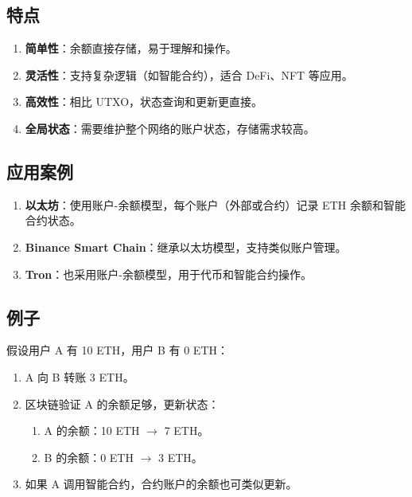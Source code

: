\documentclass[12pt]{ctexart}
\begin{document}
\subsection{特点}
\begin{enumerate}
    \item \textbf{简单性}：余额直接存储，易于理解和操作。
    \item \textbf{灵活性}：支持复杂逻辑（如智能合约），适合 DeFi、NFT 等应用。
    \item \textbf{高效性}：相比 UTXO，状态查询和更新更直接。
    \item \textbf{全局状态}：需要维护整个网络的账户状态，存储需求较高。
\end{enumerate}

\subsection{应用案例}
\begin{enumerate}
    \item \textbf{以太坊}：使用账户-余额模型，每个账户（外部或合约）记录 ETH 余额和智能合约状态。
    \item \textbf{Binance Smart Chain}：继承以太坊模型，支持类似账户管理。
    \item \textbf{Tron}：也采用账户-余额模型，用于代币和智能合约操作。
\end{enumerate}

\subsection{例子}
假设用户 A 有 10 ETH，用户 B 有 0 ETH：
\begin{enumerate}
    \item A 向 B 转账 3 ETH。
    \item 区块链验证 A 的余额足够，更新状态：
        \begin{enumerate}
            \item A 的余额：10 ETH $\rightarrow$ 7 ETH。
            \item B 的余额：0 ETH $\rightarrow$ 3 ETH。
        \end{enumerate}
    \item 如果 A 调用智能合约，合约账户的余额也可类似更新。
\end{enumerate}
\end{document}
